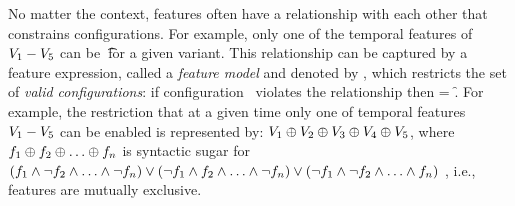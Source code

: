 No matter the context, features often have a relationship with each other that
constrains configurations. For example, only one of the temporal features of $\vOne - \vFive$
can be \t\ for a given variant.
This relationship can be captured by a feature expression, called a \emph{feature model} and
denoted by \fModel,
which restricts the set of \emph{valid configurations}:
if configuration \config\ violates the relationship then 
\fSem \fModel = \f.
For example, the restriction that at a given time only one of temporal features $\vOne - \vFive$
can be enabled is represented by:
\ensuremath{
\vOne \oplus \vTwo \oplus \vThree \oplus \vFour \oplus \vFive
},
where $\A \oplus \B \oplus \ldots \oplus \fName_n$ is syntactic sugar for $(\A \wedge \neg \B \wedge \ldots \wedge \neg \fName_n) \vee (\neg \A \wedge \B \wedge \ldots \wedge \neg \fName_n) \vee (\neg \A \wedge \neg \B \wedge \ldots \wedge \fName_n)$
, i.e., features are mutually exclusive.





